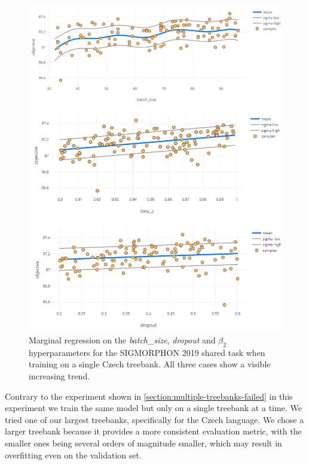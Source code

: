 \begin{figure}
	\begin{center}
		\includegraphics[width=1.0\textwidth]{images/czech-hyperparam-trends.png}
		\caption{Marginal regression on the \emph{batch\_size}, \emph{dropout} and $\beta_2$ hyperparameters for the SIGMORPHON 2019 shared task when training on a single Czech treebank. All three cases show a visible increasing trend.}
		\label{figure:czech-batch-size}
	\end{center}
\end{figure}


Contrary to the experiment shown in \autoref{section:multiple-treebanks-failed} in this experiment we train the same model but only on a single treebank at a time. We tried one of our largest treebanks, specifically for the Czech language. We chose a larger treebank because it provides a more consistent evaluation metric, with the smaller ones being several orders of magnitude smaller, which may result in overfitting even on the validation set.

